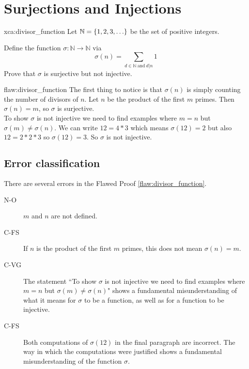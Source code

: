 \section{Surjections and Injections}

\begin{xca}{xca:divisor_function}
Let $\mathbb N = \{1, 2, 3, \ldots \}$ be the set of positive integers.

\noindent Define the function $\sigma :\mathbb{N} \to \mathbb{N}$ via 
$$\sigma (n) = \sum_{d \in \mathbb{N}\:\text{and}\: d|n}1$$
Prove that $\sigma $  is surjective but not injective. 
\end{xca}

\begin{flaw}{flaw:divisor_function} 
The first thing to notice is that $\sigma (n)$ is simply counting the number of divisors of $n$. Let $n$ be the product of the first $m$ primes. Then $\sigma (n) = m$, so $\sigma $ is surjective.   \\

To show $\sigma $ is not injective we need to find examples where $m = n$ but $\sigma (m) \neq \sigma (n)$. We can write $12 = 4*3$ which means $\sigma (12) = 2$ but also $12 = 2*2*3$ so $\sigma (12) = 3$. So $\sigma $ is not injective. 
\end{flaw}

\clearpage
\subsection{Error classification}

There are several errors
 in the Flawed Proof \ref{flaw:divisor_function}. 
 
 \begin{description}
    \item[N-O] $m$ and $n$ are not defined.
    \item[C-FS] If $n$ is the product of the first $m$ primes, this does not mean $\sigma (n) = m$.
    \item[C-VG] The statement ``To show $\sigma $ is not injective we need to find examples where $m = n$ but $\sigma (m) \neq \sigma (n)$" shows a fundamental misunderstanding of what it means for $\sigma$ to be a function, as well as for a function to be injective. 
    \item[C-FS] Both computations of $\sigma (12)$ in the final paragraph are incorrect. The way in which the computations were justified shows a fundamental misunderstanding of the function $\sigma $. 
 \end{description}

